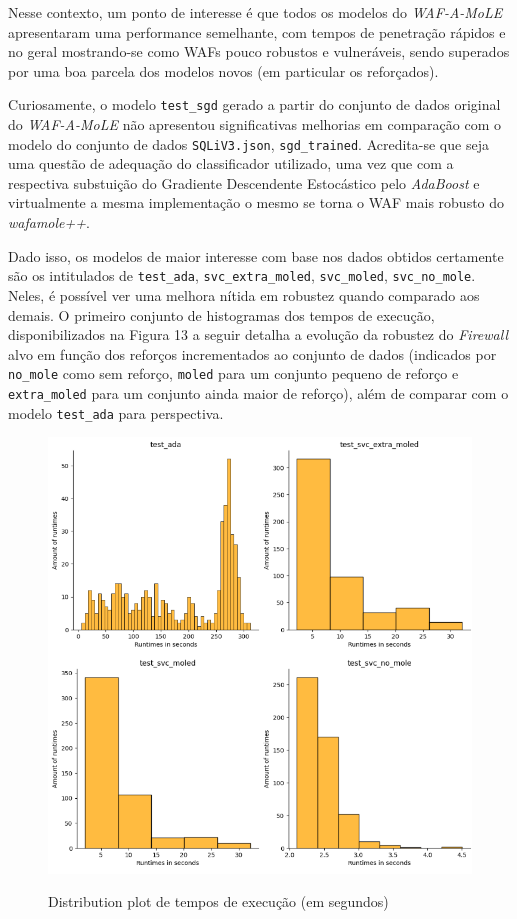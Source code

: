 Nesse contexto, um ponto  de interesse é que todos os modelos do \textit{WAF-A-MoLE} apresentaram uma performance semelhante, com tempos de penetração rápidos e no geral mostrando-se como WAFs pouco robustos e vulneráveis, sendo superados por uma boa parcela dos modelos novos (em particular os reforçados).

Curiosamente, o modelo \verb+test_sgd+ gerado a partir do conjunto de dados original do \textit{WAF-A-MoLE} não apresentou significativas melhorias em comparação com o modelo do conjunto de dados \verb+SQLiV3.json+, \verb+sgd_trained+. Acredita-se que seja uma questão de adequação do classificador utilizado, uma vez que com a respectiva substuição do Gradiente Descendente Estocástico pelo \textit{AdaBoost} e virtualmente a mesma implementação o mesmo se torna o WAF mais robusto do \textit{wafamole++}.

Dado isso, os modelos de maior interesse com base nos dados obtidos certamente são os intitulados de \verb+test_ada+, \verb+svc_extra_moled+, \verb+svc_moled+, \verb+svc_no_mole+. Neles, é possível ver uma melhora nítida em robustez quando comparado aos demais. O primeiro conjunto de histogramas dos tempos de execução, disponibilizados na Figura 13 a seguir detalha a evolução da robustez do \textit{Firewall} alvo em função dos reforços incrementados ao conjunto de dados (indicados por \verb+no_mole+ como sem reforço, \verb+moled+ para um conjunto pequeno de reforço e \verb+extra_moled+ para um conjunto ainda maior de reforço), além de comparar com o modelo \verb+test_ada+ para perspectiva. 

\begin{figure}[ht]
    \centering
    \caption{Distribution plot de tempos de execução (em segundos)}
    \includegraphics[width=18cm]{figuras/graficos/runtimes_amount_set1.png} 
    \label{fig:mole-evolution} 
\end{figure}

